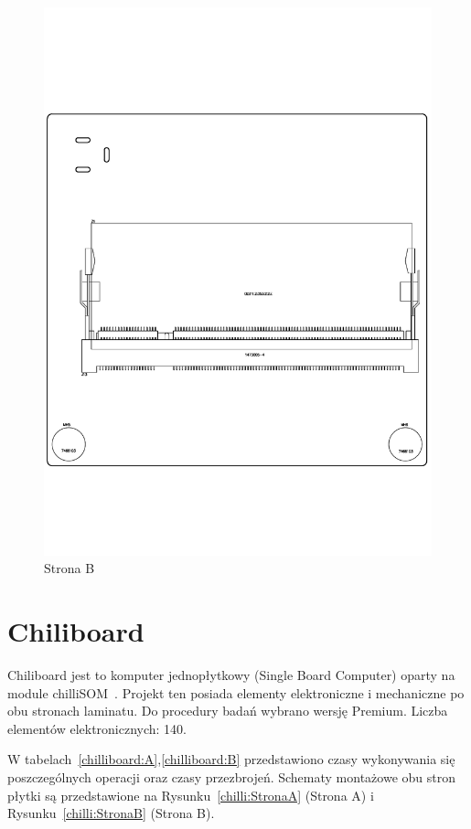 \begin{figure}[H]
	\centering
	\includegraphics[width=0.7\linewidth,clip, trim=0cm 4cm 0cm 4cm]{./chapters/chapter5/liteboard_B.pdf}
	\caption{Strona B}\label{liteboard:StronaB}
\end{figure}

\section{Chiliboard}

Chiliboard jest to komputer jednopłytkowy (Single Board Computer) oparty na module chilliSOM~\cite{chiliboard}. Projekt ten posiada elementy elektroniczne i mechaniczne po obu stronach laminatu. Do procedury badań wybrano wersję Premium. Liczba elementów elektronicznych: 140.

\breakparagraph{}
W tabelach~\ref{chilliboard:A},\ref{chilliboard:B} przedstawiono czasy wykonywania się poszczególnych operacji oraz czasy przezbrojeń. Schematy montażowe obu stron płytki są przedstawione na Rysunku~\ref{chilli:StronaA} (Strona A) i Rysunku~\ref{chilli:StronaB} (Strona B).


